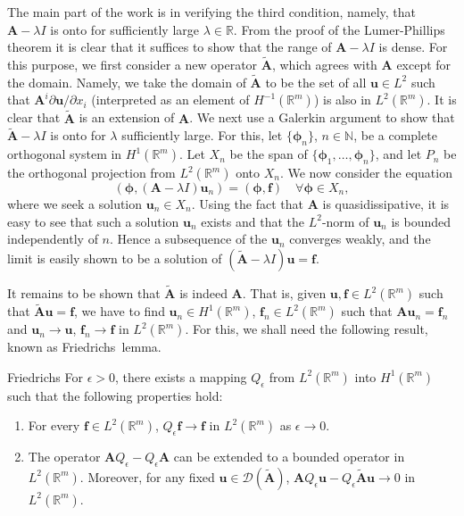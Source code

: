 The main part of the work is in verifying the third condition, namely, that $\bm{A}-\lambda I$ is onto for sufficiently large $\lambda\in\mathbb{R}$. From the proof of the Lumer-Phillips theorem it is clear that it suffices to show that the range of $\bm{A}-\lambda I$ is dense. For this purpose, we first consider a new operator $\widetilde{\bm{A}}$, which agrees with $\bm{A}$ except for the domain. Namely, we take the domain of $\widetilde{\bm{A}}$ to be the set of all $\bm{u}\in L^2$ such that $\bm{A}^i\partial\bm{u}/\partial x_i$ (interpreted as an element of $H^{-1}(\mathbb{R}^m)$) is also in $L^2(\mathbb{R}^m)$. It is clear that $\widetilde{\bm{A}}$ is an extension of $\bm{A}$. We next use a Galerkin argument to show that $\widetilde{\bm{A}}-\lambda I$ is onto for $\lambda$ sufficiently large. For this, let $\{\bm{\phi}_n\}$, $n\in\mathbb{N}$, be a complete orthogonal system in $H^1(\mathbb{R}^m)$. Let $X_n$ be the span of $\{\bm{\phi}_1,\ldots,\bm{\phi}_n\}$, and let $P_n$ be the orthogonal projection from $L^2(\mathbb{R}^m)$ onto $X_n$. We now consider the equation
\begin{equation}\label{eq:symmetric-hyperbolic-resolvent-galerkin-equation}
(\bm{\phi},(\bm{A}-\lambda I)\bm{u}_n)=(\bm{\phi},\bm{f})\quad\forall\bm{\phi}\in X_n,
\end{equation}
where we seek a solution $\bm{u}_n\in X_n$. Using the fact that $\bm{A}$ is quasidissipative, it is easy to see that such a solution $\bm{u}_n$ exists and that the $L^2$-norm of $\bm{u}_n$ is bounded independently of $n$. Hence a subsequence of the $\bm{u}_n$ converges weakly, and the limit is easily shown to be a solution of $(\widetilde{\bm{A}}-\lambda I)\bm{u}=\bm{f}$.\par It remains to be shown that $\widetilde{\bm{A}}$ is indeed $\bm{A}$. That is, given $\bm{u},\bm{f}\in L^2(\mathbb{R}^m)$ such that $\widetilde{\bm{A}}\bm{u}=\bm{f}$, we have to find $\bm{u}_n\in H^1(\mathbb{R}^m)$, $\bm{f}_n\in L^2(\mathbb{R}^m)$ such that $\bm{A}\bm{u}_n=\bm{f}_n$ and $\bm{u}_n\to\bm{u}$, $\bm{f}_n\to\bm{f}$ in $L^2(\mathbb{R}^m)$. For this, we shall need the following result, known as Friedrichs\textquotesingle\ lemma.

\begin{Lemma}{Friedrichs}
\label{lem:friedrichs-commutator-approximation}
For $\epsilon>0$, there exists a mapping $Q_\epsilon$ from $L^2(\mathbb{R}^m)$ into $H^1(\mathbb{R}^m)$ such that the following properties hold:\begin{enumerate}\item For every $\bm{f}\in L^2(\mathbb{R}^m)$, $Q_\epsilon\bm{f}\to\bm{f}$ in $L^2(\mathbb{R}^m)$ as $\epsilon\to0$.\item The operator $\bm{A}Q_\epsilon-Q_\epsilon\bm{A}$ can be extended to a bounded operator in $L^2(\mathbb{R}^m)$. Moreover, for any fixed $\bm{u}\in\mathcal{D}(\widetilde{\bm{A}})$, $\bm{A}Q_\epsilon\bm{u}-Q_\epsilon\widetilde{\bm{A}}\bm{u}\to0$ in $L^2(\mathbb{R}^m)$.\end{enumerate}
\end{Lemma}

